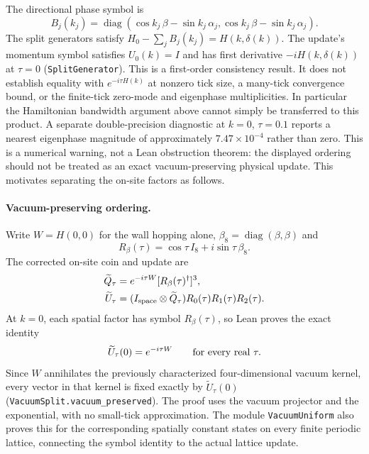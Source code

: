 The directional phase symbol is
\begin{equation}
 B_j(k_j)=\operatorname{diag}(\cos k_j\,\beta-\sin k_j\,\alpha_j,
                              \cos k_j\,\beta-\sin k_j\,\alpha_j).
\end{equation}
The split generators satisfy $H_0-\sum_j B_j(k_j)=H(k,\delta(k))$. The update's momentum symbol satisfies $U_0(k)=I$ and has first derivative $-iH(k,\delta(k))$ at $\tau=0$ (\nolinkurl{SplitGenerator}). This is a first-order consistency result. It does not establish equality with $e^{-i\tau H(k)}$ at nonzero tick size, a many-tick convergence bound, or the finite-tick zero-mode and eigenphase multiplicities. In particular the Hamiltonian bandwidth argument above cannot simply be transferred to this product. A separate double-precision diagnostic at $k=0$, $\tau=0.1$ reports a nearest eigenphase magnitude of approximately $7.47\times10^{-4}$ rather than zero. This is a numerical warning, not a Lean obstruction theorem: the displayed ordering should not be treated as an exact vacuum-preserving physical update. This motivates separating the on-site factors as follows.

\paragraph{Vacuum-preserving ordering.}
Write $W=H(0,0)$ for the wall hopping alone, $\beta_8=\operatorname{diag}(\beta,\beta)$ and
\begin{equation}
 R_\beta(\tau)=\cos\tau\,I_8+i\sin\tau\,\beta_8.
\end{equation}
The corrected on-site coin and update are
\begin{equation}
 \begin{aligned}
 \widetilde Q_\tau&=e^{-i\tau W}[R_\beta(\tau)^\dagger]^3,\\
 \widetilde U_\tau&=(I_{\rm space}\otimes\widetilde Q_\tau)
                      R_0(\tau)R_1(\tau)R_2(\tau).
 \end{aligned}
\end{equation}
At $k=0$, each spatial factor has symbol $R_\beta(\tau)$, so Lean proves the exact identity
\begin{equation}
 \widetilde U_\tau(0)=e^{-i\tau W}
 \qquad\hbox{for every real }\tau.
\end{equation}
Since $W$ annihilates the previously characterized four-dimensional vacuum kernel, every vector in that kernel is fixed exactly by $\widetilde U_\tau(0)$ (\nolinkurl{VacuumSplit.vacuum_preserved}). The proof uses the vacuum projector and the exponential, with no small-tick approximation. The module \nolinkurl{VacuumUniform} also proves this for the corresponding spatially constant states on every finite periodic lattice, connecting the symbol identity to the actual lattice update.

